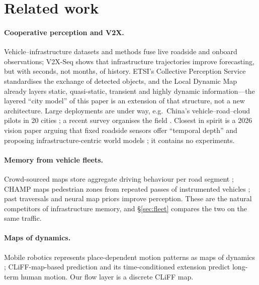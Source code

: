\documentclass[11pt,a4paper]{article}
\begin{document}
\section{Related work}
\label{sec:related}

\paragraph{Cooperative perception and V2X.}
Vehicle--infrastructure datasets \citep{yu2022dairv2x,yu2023v2xseq} and methods \citep{hu2022where2comm,yu2025univ2x} fuse live roadside and onboard observations; V2X-Seq shows that infrastructure trajectories improve forecasting, but with seconds, not months, of history.
ETSI's Collective Perception Service \citep{etsi2023cpm} standardises the exchange of detected objects, and the Local Dynamic Map \citep{etsi2014ldm} already layers static, quasi-static, transient and highly dynamic information---the layered ``city model'' of this paper is an extension of that structure, not a new architecture.
Large deployments are under way, e.g.\ China's vehicle--road--cloud pilots in 20 cities \citep{caixin2024vrc}; a recent survey organises the field \citep{zhang2025survey}.
Closest in spirit is a 2026 vision paper arguing that fixed roadside sensors offer ``temporal depth'' and proposing infrastructure-centric world models \citep{meng2026iwm}; it contains no experiments.

\paragraph{Memory from vehicle fleets.}
Crowd-sourced maps store aggregate driving behaviour per road segment \citep{mobileye_rem}; CHAMP maps pedestrian zones from repeated passes of instrumented vehicles \citep{greer2023champ}; past traversals \citep{you2022hindsight} and neural map priors \citep{xiong2023nmp} improve perception.
These are the natural competitors of infrastructure memory, and \S\ref{sec:fleet} compares the two on the same traffic.

\paragraph{Maps of dynamics.}
Mobile robotics represents place-dependent motion patterns as maps of dynamics \citep{kucner2023mod}; CLiFF-map-based prediction \citep{zhu2023cliff} and its time-conditioned extension \citep{zhu2025stmod} predict long-term human motion. Our flow layer is a discrete CLiFF map.
\end{document}
